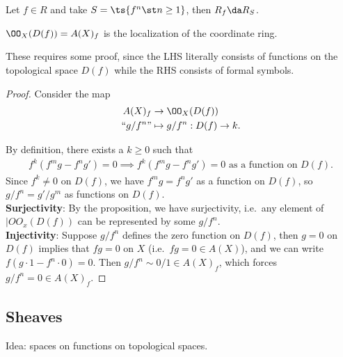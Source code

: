\begin{example}

Let \(f\in R\) and take \(S = \ts{f^n \st n\geq 1}\), then
\(R_f \da R_S\).

\end{example}

\begin{corollary}[?]

\(\OO_X(D(f)) = A(X)_f\) is the localization of the coordinate ring.

\end{corollary}

These requires some proof, since the LHS literally consists of functions
on the topological space \(D(f)\) while the RHS consists of formal
symbols.

\begin{proof}

Consider the map
\begin{align*}  
A(X)_f &\to \OO_X(D(f)) \\
``g/f^n" &\mapsto g/f^n: D(f) \to k
.\end{align*}

By definition, there exists a \(k\geq 0\) such that
\begin{align*}  
f^k(f^m g - f^n g') = 0 
\implies
f^k(f^m g - f^n g') = 0 \text{ as a function on } D(f)
.\end{align*} Since \(f^k \neq 0\) on \(D(f)\), we have
\(f^m g = f^n g'\) as a function on \(D(f)\), so \(g/f^n = g'/g^m\) as
functions on \(D(f)\).\\

\textbf{Surjectivity}: By the proposition, we have surjectivity,
i.e.~any element of \(|OO_x(D(f))\) can be represented by some
\(g/f^n\).\\

\textbf{Injectivity}: Suppose \(g/f^n\) defines the zero function on
\(D(f)\), then \(g = 0\) on \(D(f)\) implies that \(fg=0\) on \(X\)
(i.e.~\(fg= 0 \in A(X)\)), and we can write
\(f(g\cdot 1 - f^n\cdot 0) = 0\). Then \(g/f^n\sim 0/1 \in A(X)_f\),
which forces \(g/f^n = 0\in A(X)_f\).

\end{proof}

\hypertarget{sheaves}{%
\subsection{Sheaves}\label{sheaves}}

Idea: spaces on functions on topological spaces.


